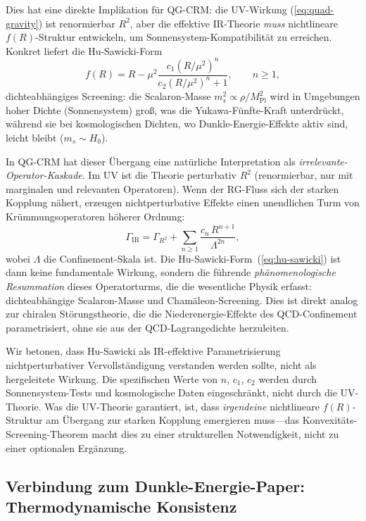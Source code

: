 \documentclass[aps,prd,twocolumn,superscriptaddress,nofootinbib]{revtex4-2}
\begin{document}
Dies hat eine direkte Implikation für QG-CRM: die UV-Wirkung (\ref{eq:quad-gravity}) ist renormierbar $R^2$, aber die effektive IR-Theorie \textit{muss} nichtlineare $f(R)$-Struktur entwickeln, um Sonnensystem-Kompatibilität zu erreichen. Konkret liefert die Hu-Sawicki-Form~\cite{HuSawicki2007}
\begin{equation}
f(R) = R - \mu^2\frac{c_1(R/\mu^2)^n}{c_2(R/\mu^2)^n + 1}, \qquad n \geq 1,
\label{eq:hu-sawicki}
\end{equation}
dichteabhängiges Screening: die Scalaron-Masse $m_s^2 \propto \rho/M_\mathrm{Pl}^2$ wird in Umgebungen hoher Dichte (Sonnensystem) groß, was die Yukawa-Fünfte-Kraft unterdrückt, während sie bei kosmologischen Dichten, wo Dunkle-Energie-Effekte aktiv sind, leicht bleibt ($m_s \sim H_0$).

In QG-CRM hat dieser Übergang eine natürliche Interpretation als \textit{irrelevante-Operator-Kaskade}. Im UV ist die Theorie perturbativ $R^2$ (renormierbar, nur mit marginalen und relevanten Operatoren). Wenn der RG-Fluss sich der starken Kopplung nähert, erzeugen nichtperturbative Effekte einen unendlichen Turm von Krümmungsoperatoren höherer Ordnung:
\begin{equation}
\Gamma_\mathrm{IR} = \Gamma_{R^2} + \sum_{n \geq 1} \frac{c_n\,R^{n+1}}{\Lambda^{2n}},
\end{equation}
wobei $\Lambda$ die Confinement-Skala ist. Die Hu-Sawicki-Form~(\ref{eq:hu-sawicki}) ist dann keine fundamentale Wirkung, sondern die führende \textit{phänomenologische Resummation} dieses Operatorturms, die die wesentliche Physik erfasst: dichteabhängige Scalaron-Masse und Chamäleon-Screening. Dies ist direkt analog zur chiralen Störungstheorie, die die Niederenergie-Effekte des QCD-Confinement parametrisiert, ohne sie aus der QCD-Lagrangedichte herzuleiten.

Wir betonen, dass Hu-Sawicki als IR-effektive Parametrisierung nichtperturbativer Vervollständigung verstanden werden sollte, nicht als hergeleitete Wirkung. Die spezifischen Werte von $n$, $c_1$, $c_2$ werden durch Sonnensystem-Tests und kosmologische Daten eingeschränkt, nicht durch die UV-Theorie. Was die UV-Theorie garantiert, ist, dass \textit{irgendeine} nichtlineare $f(R)$-Struktur am Übergang zur starken Kopplung emergieren muss---das Konvexitäts-Screening-Theorem macht dies zu einer strukturellen Notwendigkeit, nicht zu einer optionalen Ergänzung.

\subsection{Verbindung zum Dunkle-Energie-Paper: Thermodynamische Konsistenz}
\label{sec:de-connection}
\end{document}
